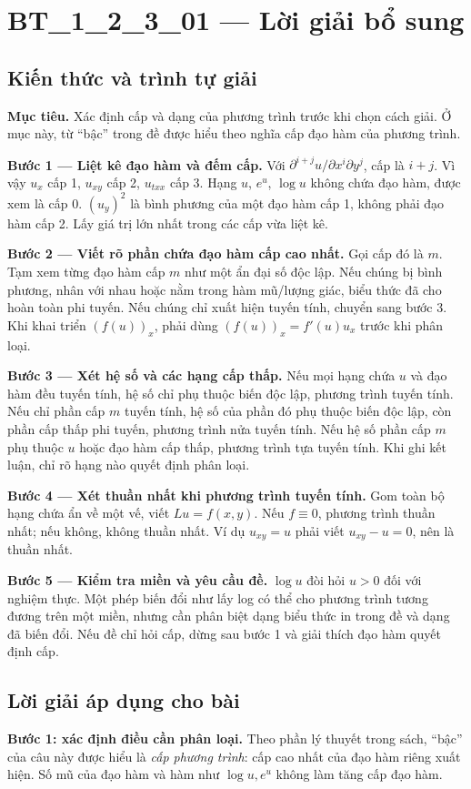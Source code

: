 \documentclass[10pt,a4paper]{article}
\begin{document}
\section*{BT\_1\_2\_3\_01 — Lời giải bổ sung}
\subsection*{Kiến thức và trình tự giải}
\textbf{Mục tiêu.} Xác định cấp và dạng của phương trình trước khi chọn cách giải. Ở mục này, từ “bậc” trong đề được hiểu theo nghĩa cấp đạo hàm của phương trình.

\textbf{Bước 1 — Liệt kê đạo hàm và đếm cấp.} Với $\partial^{i+j}u/\partial x^i\partial y^j$, cấp là $i+j$. Vì vậy $u_x$ cấp 1, $u_{xy}$ cấp 2, $u_{txx}$ cấp 3. Hạng $u$, $e^u$, $\log u$ không chứa đạo hàm, được xem là cấp 0. $(u_y)^2$ là bình phương của một đạo hàm cấp 1, không phải đạo hàm cấp 2. Lấy giá trị lớn nhất trong các cấp vừa liệt kê.

\textbf{Bước 2 — Viết rõ phần chứa đạo hàm cấp cao nhất.} Gọi cấp đó là $m$. Tạm xem từng đạo hàm cấp $m$ như một ẩn đại số độc lập. Nếu chúng bị bình phương, nhân với nhau hoặc nằm trong hàm mũ/lượng giác, biểu thức đã cho hoàn toàn phi tuyến. Nếu chúng chỉ xuất hiện tuyến tính, chuyển sang bước 3. Khi khai triển $(f(u))_x$, phải dùng $(f(u))_x=f'(u)u_x$ trước khi phân loại.

\textbf{Bước 3 — Xét hệ số và các hạng cấp thấp.} Nếu mọi hạng chứa $u$ và đạo hàm đều tuyến tính, hệ số chỉ phụ thuộc biến độc lập, phương trình tuyến tính. Nếu chỉ phần cấp $m$ tuyến tính, hệ số của phần đó phụ thuộc biến độc lập, còn phần cấp thấp phi tuyến, phương trình nửa tuyến tính. Nếu hệ số phần cấp $m$ phụ thuộc $u$ hoặc đạo hàm cấp thấp, phương trình tựa tuyến tính. Khi ghi kết luận, chỉ rõ hạng nào quyết định phân loại.

\textbf{Bước 4 — Xét thuần nhất khi phương trình tuyến tính.} Gom toàn bộ hạng chứa ẩn về một vế, viết $Lu=f(x,y)$. Nếu $f\equiv0$, phương trình thuần nhất; nếu không, không thuần nhất. Ví dụ $u_{xy}=u$ phải viết $u_{xy}-u=0$, nên là thuần nhất.

\textbf{Bước 5 — Kiểm tra miền và yêu cầu đề.} $\log u$ đòi hỏi $u>0$ đối với nghiệm thực. Một phép biến đổi như lấy log có thể cho phương trình tương đương trên một miền, nhưng cần phân biệt dạng biểu thức in trong đề và dạng đã biến đổi. Nếu đề chỉ hỏi cấp, dừng sau bước 1 và giải thích đạo hàm quyết định cấp.
\subsection*{Lời giải áp dụng cho bài}
\textbf{Bước 1: xác định điều cần phân loại.} Theo phần lý thuyết trong sách, ``bậc'' của câu này được hiểu là \emph{cấp phương trình}: cấp cao nhất của đạo hàm riêng xuất hiện. Số mũ của đạo hàm và hàm như $\log u,e^u$ không làm tăng cấp đạo hàm.
\end{document}
